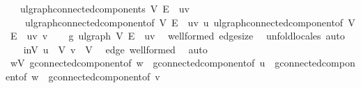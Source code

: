 \begin{isabellebody}
\ \ \ {\isachardoublequoteopen}ulgraph{\isachardot}{\kern0pt}connected{\isacharunderscore}{\kern0pt}components\ V\ {\isacharparenleft}{\kern0pt}E\ {\isacharminus}{\kern0pt}\ {\isacharbraceleft}{\kern0pt}{\isacharbraceleft}{\kern0pt}u{\isacharcomma}{\kern0pt}v{\isacharbraceright}{\kern0pt}{\isacharbraceright}{\kern0pt}{\isacharparenright}{\kern0pt}\ {\isacharequal}{\kern0pt}\isanewline
\ \ \ \ {\isacharbraceleft}{\kern0pt}ulgraph{\isachardot}{\kern0pt}connected{\isacharunderscore}{\kern0pt}component{\isacharunderscore}{\kern0pt}of\ V\ {\isacharparenleft}{\kern0pt}E\ {\isacharminus}{\kern0pt}\ {\isacharbraceleft}{\kern0pt}{\isacharbraceleft}{\kern0pt}u{\isacharcomma}{\kern0pt}v{\isacharbraceright}{\kern0pt}{\isacharbraceright}{\kern0pt}{\isacharparenright}{\kern0pt}\ u{\isacharcomma}{\kern0pt}\ ulgraph{\isachardot}{\kern0pt}connected{\isacharunderscore}{\kern0pt}component{\isacharunderscore}{\kern0pt}of\ V\ {\isacharparenleft}{\kern0pt}E\ {\isacharminus}{\kern0pt}\ {\isacharbraceleft}{\kern0pt}{\isacharbraceleft}{\kern0pt}u{\isacharcomma}{\kern0pt}v{\isacharbraceright}{\kern0pt}{\isacharbraceright}{\kern0pt}{\isacharparenright}{\kern0pt}\ v{\isacharbraceright}{\kern0pt}{\isachardoublequoteclose}\isanewline
%
\isadelimproof
%
\endisadelimproof
%
\isatagproof
{}\isamarkupfalse%
{\isacharminus}{\kern0pt}\isanewline
\ \ \isamarkupfalse%
\ g{\isacharprime}{\kern0pt}{\isacharcolon}{\kern0pt}\ ulgraph\ V\ {\isachardoublequoteopen}E\ {\isacharminus}{\kern0pt}\ {\isacharbraceleft}{\kern0pt}{\isacharbraceleft}{\kern0pt}u{\isacharcomma}{\kern0pt}v{\isacharbraceright}{\kern0pt}{\isacharbraceright}{\kern0pt}{\isachardoublequoteclose}\ \isamarkupfalse%
\ wellformed\ edge{\isacharunderscore}{\kern0pt}size\ \isamarkupfalse%
\ {\isacharparenleft}{\kern0pt}unfold{\isacharunderscore}{\kern0pt}locales{\isacharcomma}{\kern0pt}\ auto{\isacharparenright}{\kern0pt}\isanewline
\ \ \isamarkupfalse%
\ inV{\isacharcolon}{\kern0pt}\ {\isachardoublequoteopen}u\ {\isasymin}\ V{\isachardoublequoteclose}\ {\isachardoublequoteopen}v\ {\isasymin}\ V{\isachardoublequoteclose}\ \isamarkupfalse%
\ edge\ wellformed\ \isamarkupfalse%
\ auto\isanewline
\ \ \isamarkupfalse%
\ {\isachardoublequoteopen}{\isasymforall}w{\isasymin}V{\isachardot}{\kern0pt}\ g{\isacharprime}{\kern0pt}{\isachardot}{\kern0pt}connected{\isacharunderscore}{\kern0pt}component{\isacharunderscore}{\kern0pt}of\ w\ {\isacharequal}{\kern0pt}\ g{\isacharprime}{\kern0pt}{\isachardot}{\kern0pt}connected{\isacharunderscore}{\kern0pt}component{\isacharunderscore}{\kern0pt}of\ u\ {\isasymor}\ g{\isacharprime}{\kern0pt}{\isachardot}{\kern0pt}connected{\isacharunderscore}{\kern0pt}component{\isacharunderscore}{\kern0pt}of\ w\ {\isacharequal}{\kern0pt}\ g{\isacharprime}{\kern0pt}{\isachardot}{\kern0pt}connected{\isacharunderscore}{\kern0pt}component{\isacharunderscore}{\kern0pt}of\ v{\isachardoublequoteclose}\isanewline

\end{isabellebody}
